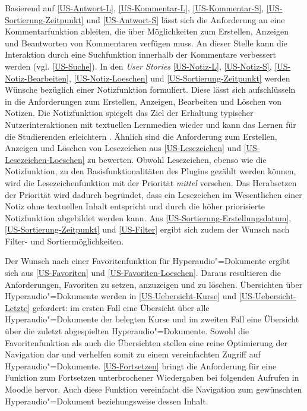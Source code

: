 Basierend auf \ref{US-Antwort-L}, \ref{US-Kommentar-L}, \ref{US-Kommentar-S}, \ref{US-Sortierung-Zeitpunkt} und \ref{US-Antwort-S} lässt sich die Anforderung an eine Kommentarfunktion ableiten, die über Möglichkeiten zum Erstellen, Anzeigen und Beantworten von Kommentaren verfügen muss. An dieser Stelle kann die Interaktion durch eine Suchfunktion innerhalb der Kommentare verbessert werden (vgl. \ref{US-Suche}). In den \textit{User Stories} \ref{US-Notiz-L}, \ref{US-Notiz-S}, \ref{US-Notiz-Bearbeiten}, \ref{US-Notiz-Loeschen} und \ref{US-Sortierung-Zeitpunkt} werden Wünsche bezüglich einer Notizfunktion formuliert. Diese lässt sich aufschlüsseln in die Anforderungen zum Erstellen, Anzeigen, Bearbeiten und Löschen von Notizen. Die Notizfunktion spiegelt das Ziel der Erhaltung typischer Nutzerinteraktionen mit textuellen Lernmedien wieder und kann das Lernen für die Studierenden erleichtern \citep{scutter2010students}. Ähnlich sind die Anforderung zum Erstellen, Anzeigen und Löschen von Lesezeichen aus \ref{US-Lesezeichen} und \ref{US-Lesezeichen-Loeschen} zu bewerten. Obwohl Lesezeichen, ebenso wie die Notizfunktion, zu den Basisfunktionalitäten des Plugins gezählt werden können, wird die Lesezeichenfunktion mit der Priorität \textit{mittel} versehen. Das Herabsetzen der Priorität wird dadurch begründet, dass ein Lesezeichen im Wesentlichen einer Notiz ohne textuellen Inhalt entspricht und durch die höher priorisierte Notizfunktion abgebildet werden kann. Aus \ref{US-Sortierung-Erstellungsdatum}, \ref{US-Sortierung-Zeitpunkt} und \ref{US-Filter} ergibt sich zudem der Wunsch nach Filter- und Sortiermöglichkeiten. 

Der Wunsch nach einer Favoritenfunktion für Hyperaudio"=Dokumente ergibt sich aus \ref{US-Favoriten} und \ref{US-Favoriten-Loeschen}. Daraus resultieren die Anforderungen, Favoriten zu setzen, anzuzeigen und zu löschen. Übersichten über Hyperaudio"=Dokumente werden in \ref{US-Uebersicht-Kurse} und \ref{US-Uebersicht-Letzte} gefordert: im ersten Fall eine Übersicht über alle Hyperaudio"=Dokumente der belegten Kurse und im zweiten Fall eine Übersicht über die zuletzt abgespielten Hyperaudio"=Dokumente. Sowohl die Favoritenfunktion als auch die Übersichten stellen eine reine Optimierung der Navigation dar und verhelfen somit zu einem vereinfachten Zugriff auf Hyperaudio"=Dokumente. \ref{US-Fortsetzen} bringt die Anforderung für eine Funktion zum Fortsetzen unterbrochener Wiedergaben bei folgenden Aufrufen in Moodle hervor. Auch diese Funktion vereinfacht die Navigation zum gewünschten Hyperaudio"=Dokument beziehungsweise dessen Inhalt.

